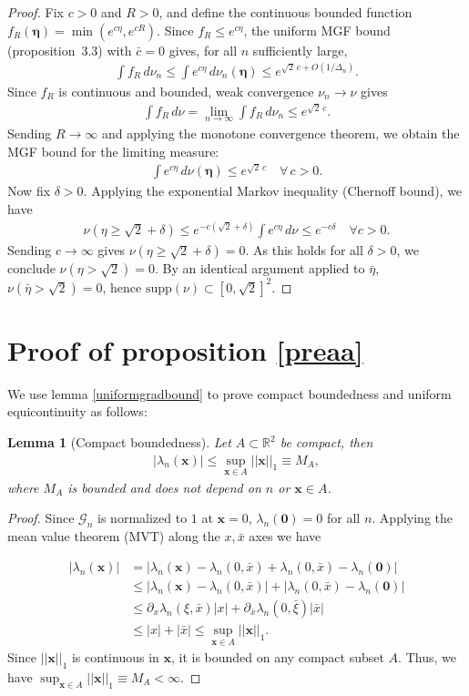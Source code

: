 \documentclass[a4paper,11pt]{article}
\theoremstyle{plain}
\newtheorem{lem}[thm]{Lemma}
\theoremstyle{definition}
\theoremstyle{remark}
\newcommand{\bs}[1]{\boldsymbol{#1}}
\newcommand{\ba}{\begin{equation} \begin{aligned}}
\newcommand{\ea}{\end{aligned} \end{equation}}
\newcommand{\De}{\Delta}
\begin{document}
\begin{appendix}
\begin{proof}
Fix $c > 0$ and $R > 0$, and define the continuous bounded function $f_R(\bs{\eta}) = \min(e^{c\eta}, e^{cR})$. Since $f_R \leq e^{c\eta}$, the uniform MGF bound (proposition~3.3) with $\bar{c} = 0$ gives, for all $n$ sufficiently large,
\ba
\int f_R\, d\nu_n \leq \int e^{c\eta}\, d\nu_n(\bs{\eta}) \leq e^{\sqrt{2}\, c + O(1/\De_n)}.
\ea
Since $f_R$ is continuous and bounded, weak convergence $\nu_n \to \nu$ gives 
\ba
\int f_R\, d\nu = \lim_{n\to\infty}\int f_R\, d\nu_n \leq e^{\sqrt{2}\, c}.
\ea
Sending $R \to \infty$ and applying the monotone convergence theorem, we obtain the MGF bound for the limiting measure:
\ba
\int e^{c\eta}\, d\nu(\bs{\eta}) \leq e^{\sqrt{2}\, c} \quad \forall\, c > 0.
\ea
Now fix $\delta > 0$. Applying the exponential Markov inequality (Chernoff bound), we have
\ba
\nu(\eta \geq \sqrt{2} + \delta) \leq e^{-c(\sqrt{2}+\delta)} \int e^{c\eta}\, d\nu \leq e^{-c\delta} \quad \forall c > 0.
\ea
Sending $c \to \infty$ gives $\nu(\eta \geq \sqrt{2} + \delta) = 0$. As this holds for all $\delta > 0$, we conclude $\nu(\eta > \sqrt{2}) = 0$. By an identical argument applied to $\bar{\eta}$, $\nu(\bar{\eta} > \sqrt{2}) = 0$, hence $\mathrm{supp}(\nu) \subset [0,\sqrt{2}]^2$.
\end{proof}


\section{Proof of proposition \ref{preaa}}
\label{proofofpreaa}

We use lemma \ref{uniformgradbound} to prove compact boundedness and uniform equicontinuity as follows:

\begin{lem}[Compact boundedness]\label{compactbound}
Let $A \subset \mathbb{R}^2$ be compact, then
\ba
|\lambda_n(\bs{x})| \leq \sup_{\bs{x} \in A} ||\bs{x}||_1 \equiv M_A,
\ea
where $M_A $ is bounded and does not depend on $n$ or $\bs{x} \in A$.
\end{lem}
\begin{proof}
Since $\mathcal{G}_n$ is normalized to $1$ at $\bs{x} = 0$, $\lambda_n(\bs{0}) = 0$ for all $n$. Applying the mean value theorem (MVT) along the $x,\bar{x}$ axes we have

\ba
|\lambda_n(\bs{x})| &= |\lambda_n(\bs{x}) - \lambda_n(0,\bar{x}) + \lambda_n(0,\bar{x}) - \lambda_n(\bs{0}) | \\
&\leq |\lambda_n(\bs{x}) - \lambda_n(0,\bar{x}) | + |\lambda_n(0,\bar{x}) - \lambda_n(\bs{0})|\\
&\leq \partial_x \lambda_n(\xi,\bar{x}) |x| + \partial_{\bar{x}} \lambda_n(0,\bar{\xi}) |\bar{x}|\\
& \leq |x| + |\bar{x}| \leq \sup_{\bs{x}\in A} || \bs{x}||_1 .
\ea
Since $|| \bs{x}||_1$ is continuous in $\bs{x}$, it is bounded on any compact subset $A$. Thus, we have $\sup_{\bs{x}\in A} || \bs{x}||_1 \equiv M_A<\infty$.
\end{proof}


\end{appendix}
\end{document}
